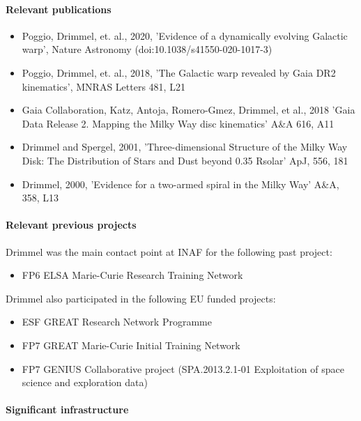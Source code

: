\paragraph{Relevant publications}
\begin{itemize}
    \item Poggio, Drimmel, et. al., 2020, 'Evidence of a dynamically evolving Galactic warp', Nature Astronomy (doi:10.1038/s41550-020-1017-3)
    \item Poggio, Drimmel, et. al., 2018, 'The Galactic warp revealed by Gaia DR2 kinematics', MNRAS Letters 481, L21
    \item  Gaia Collaboration, Katz, Antoja, Romero-Gmez, Drimmel, et al., 2018 'Gaia Data Release 2. Mapping the Milky Way disc kinematics' A&A 616, A11
    \item Drimmel and Spergel, 2001, 'Three-dimensional Structure of the Milky Way Disk: The Distribution of Stars and Dust beyond 0.35 Rsolar' ApJ, 556, 181
    \item Drimmel, 2000, 'Evidence for a two-armed spiral in the Milky Way' A&A, 358, L13
\end{itemize}

\paragraph{Relevant previous projects}

Drimmel was the main contact point at INAF for the following past project:
\begin{itemize}
    \item FP6 ELSA Marie-Curie Research Training Network
\end{itemize}
Drimmel also participated in the following EU funded projects: 
\begin{itemize}
    \item ESF GREAT Research Network Programme 
    \item FP7 GREAT Marie-Curie Initial Training Network
    \item FP7 GENIUS Collaborative project (SPA.2013.2.1-01 Exploitation of space science and exploration data)
\end{itemize}


\paragraph{Significant infrastructure}